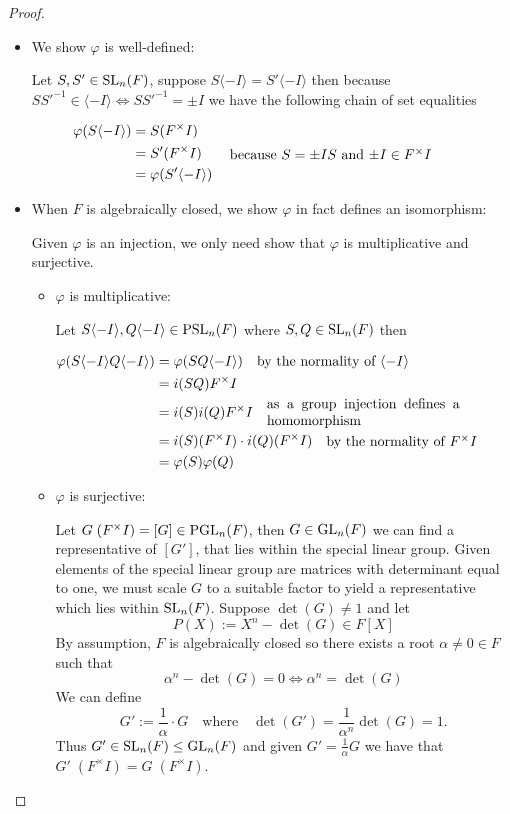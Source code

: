 \begin{proof}
\begin{itemize}
    \item We show $\varphi$ is well-defined:

Let $S, S' \in \operatorname{SL}_n(F)$, suppose $S \langle -I\rangle = S'\langle -I\rangle$ then because $SS'^{-1} \in \langle -I\rangle \iff SS'^{-1} = \pm I$ we have the following chain of set equalities

\begin{align*}
    \varphi(S \langle -I \rangle) 
    &= S (F^\times I)\\
    &= S' (F^\times I) \qquad \parbox[c]{0.5
    \linewidth}{because $S = \pm I S$ and $\pm I \in F^\times I$}\\
    &= \varphi(S' \langle -I\rangle)
\end{align*}

\item When $F$ is algebraically closed, we show $\varphi$ in fact defines an isomorphism:

Given $\varphi$ is an injection, we only need show that $\varphi$ is multiplicative and surjective.
\begin{itemize}
    \item $\varphi$ is multiplicative:

    Let $S \langle-I\rangle, Q\langle-I\rangle \in \operatorname{PSL}_n(F)$ where $S, Q \in \operatorname{SL}_n(F)$ then

    \begin{align*}
    \varphi(S \langle-I\rangle  Q\langle-I\rangle ) &= \varphi(SQ \langle -I\rangle) \quad \parbox[c]{0.4\linewidth}{by the normality of $\langle -I \rangle$}\\
    &= i(SQ) F^\times I\\
    &= i(S) i(Q) F^\times I \quad  \parbox[c]{0.4\linewidth}{as a group injection defines a homomorphism}\\
    &= i(S) (F^\times I) \cdot i(Q)(F^\times I) \quad \parbox[c] {0.4\linewidth}{ by the normality of $F^\times I$}\\
    &= \varphi(S) \varphi(Q)
    \end{align*}
    
    \item $\varphi$ is surjective:

    Let $G \; (F^\times I) = [G] \in \operatorname{PGL}_n(F)$, then $G \in \operatorname{GL}_n(F)$ we can find a representative of $[G']$, that lies within the special linear group.
    Given elements of the special linear group are matrices with determinant equal to one, we must scale $G$ to a suitable factor to yield a representative which lies within $\operatorname{SL}_n(F)$. Suppose $\det(G) \ne 1$ and let
    \[
    P(X) := X^n - \det(G) \in F[X]
    \]
    By assumption, $F$ is algebraically closed so there exists a root $\alpha \ne 0\in F$ such that 
    \[
    \alpha^n - \det(G) = 0 \iff \alpha^n = \det(G)
    \]
    We can define
    \[
    G' := \frac{1}{\alpha} \cdot G \quad \text{where} \quad \det(G') = \frac{1}{\alpha^n} \det(G) = 1.
    \]
    Thus $G' \in \operatorname{SL}_n(F) \leq \operatorname{GL}_n(F)$ and given $G' = \frac{1}{\alpha} G$ we have that $G'  \; (F^\times I) = G \; (F^\times I)$.
    

\end{itemize}
\end{itemize}
\end{proof}
